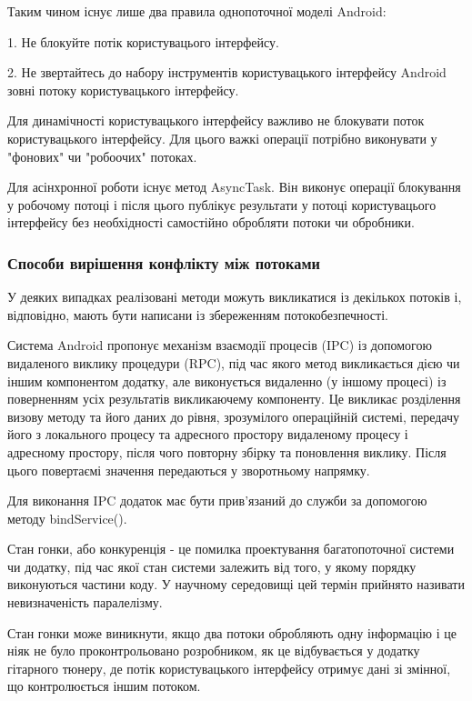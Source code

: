 Таким чином існує лише два правила однопоточної моделі Android:

1. Не блокуйте потік користувацього інтерфейсу.

2. Не звертайтесь до набору інструментів користувацького інтерфейсу Android зовні потоку користувацького інтерфейсу.

Для динамічності користувацького інтерфейсу важливо не блокувати поток користувацького інтерфейсу. Для цього важкі операції потрібно виконувати у "фонових" чи  "робоочих" потоках.

Для асінхронної роботи існує метод AsyncTask. Він виконує операції блокування у робочому потоці і після цього публікує результати у потоці користувацього інтерфейсу без необхідності самостійно обробляти потоки чи обробники. \cite{androiddevelopers}

\subsubsection{Способи вирішення конфлікту між потоками}

У деяких випадках реалізовані методи можуть викликатися із декількох потоків і, відповідно, мають бути написани із збереженням потокобезпечності.

Система Android пропонує механізм взаємодії процесів (IPC) із допомогою видаленого виклику процедури (RPC), під час якого метод викликається дією чи іншим компонентом додатку, але виконується видаленно (у іншому процесі) із поверненням усіх результатів викликаючему компоненту. Це викликає розділення визову методу та його даних до рівня, зрозумілого операційній системі, передачу його з локального процесу та адресного простору видаленому процесу і адресному простору, після чого повторну збірку та поновлення виклику. Після цього повертаємі значення передаються у зворотньому напрямку. 

Для виконання IPC додаток має бути прив'язаний до служби за допомогою методу bindService(). \cite{androiddevelopers}

Стан гонки, або конкуренція - це помилка проектування багатопоточної системи чи додатку, під час якої стан системи залежить від того, у якому порядку виконуються частини коду. У научному середовищі цей термін прийнято називати невизначеність паралелізму. \cite{jonathan2005linux}

Стан гонки може виникнути, якщо два потоки обробляють одну інформацію і це ніяк не було проконтрольовано розробником, як це відбувається у додатку гітарного тюнеру, де потік користувацького інтерфейсу отримує дані зі змінної, що контролюється іншим потоком.


